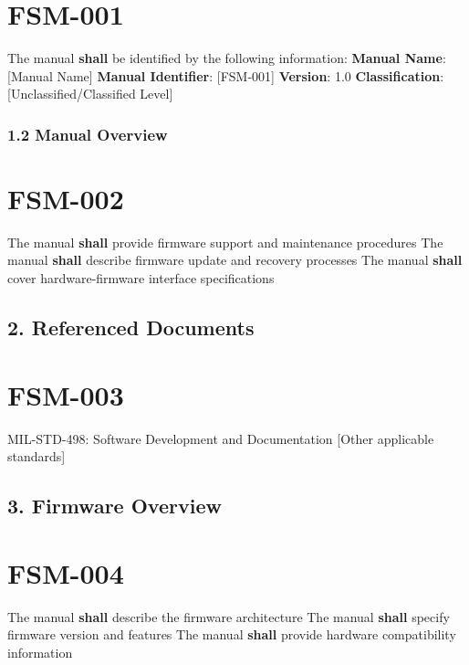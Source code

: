 \section{FSM-001}\label{FSM-001}

The manual \textbf{shall} be identified by the following information:
\textbf{Manual Name}: [Manual Name]
\textbf{Manual Identifier}: [FSM-001]
\textbf{Version}: 1.0
\textbf{Classification}: [Unclassified/Classified Level]

\subsubsection{1.2 Manual Overview}

\section{FSM-002}\label{FSM-002}

The manual \textbf{shall} provide firmware support and maintenance procedures
The manual \textbf{shall} describe firmware update and recovery processes
The manual \textbf{shall} cover hardware-firmware interface specifications

\subsection{2. Referenced Documents}

\section{FSM-003}\label{FSM-003}

MIL-STD-498: Software Development and Documentation
[Other applicable standards]\\

\subsection{3. Firmware Overview}

\section{FSM-004}\label{FSM-004}

The manual \textbf{shall} describe the firmware architecture
The manual \textbf{shall} specify firmware version and features
The manual \textbf{shall} provide hardware compatibility information


